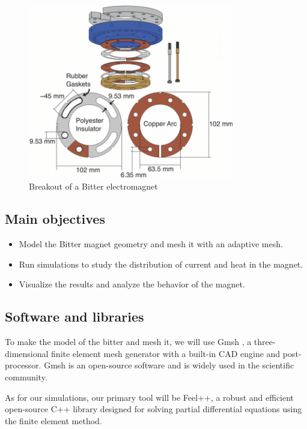 \documentclass[12pt]{article}
\begin{document}
\begin{figure}[H]
	\centering
	\includegraphics[width=0.8\textwidth]{images/Bitter-electromagnet-breakout.png}
	\caption{Breakout of a Bitter electromagnet \cite{bitter_breakout}}
\end{figure}

\subsection{Main objectives}

\begin{itemize}
	\item Model the Bitter magnet geometry and mesh it with an adaptive mesh.
	\item Run simulations to study the distribution of current and heat in the magnet.
	\item Visualize the results and analyze the behavior of the magnet.
\end{itemize}

\subsection{Software and libraries}
To make the model of the bitter and mesh it, we will use Gmsh \cite{geuzaine_gmsh_2009}, a three-dimensional
 finite element mesh generator with a built-in CAD engine and post-processor. 
Gmsh is an open-source software and is widely used in the scientific
community.

As for our simulations, our primary tool will be Feel++\cite{christophe_prudhomme_feelppfeelpp_2024}, a robust and 
efficient open-source C++ library designed for solving partial differential equations using 
the finite element method\cite{fem}.
\end{document}
